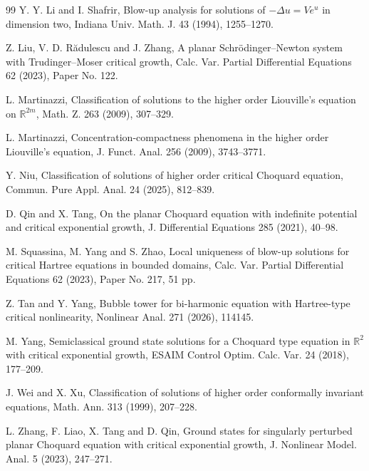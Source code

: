 \documentclass[11pt]{article}
\numberwithin{equation}{section}
\begin{document}
\begin{thebibliography}{99}
Y. Y. Li and I. Shafrir,
Blow-up analysis for solutions of $-\Delta u=Ve^{u}$ in dimension two,
Indiana Univ. Math. J. 43 (1994), 1255--1270.

Z. Liu, V. D. R\u{a}dulescu and J. Zhang,
A planar Schr\"odinger--Newton system with Trudinger--Moser critical
growth,
Calc. Var. Partial Differential Equations 62 (2023), Paper No. 122.

L. Martinazzi,
Classification of solutions to the higher order Liouville's equation on $\mathbb R^{2m}$,
Math. Z. 263 (2009), 307--329.

L. Martinazzi,
Concentration-compactness phenomena in the higher order Liouville's equation,
J. Funct. Anal. 256 (2009), 3743--3771.

Y. Niu,
Classification of solutions of higher order critical Choquard equation,
Commun. Pure Appl. Anal. 24 (2025), 812--839.

D. Qin and X. Tang,
On the planar Choquard equation with indefinite potential and critical
exponential growth,
J. Differential Equations 285 (2021), 40--98.

M. Squassina, M. Yang and S. Zhao,
Local uniqueness of blow-up solutions for critical Hartree equations in bounded domains,
Calc. Var. Partial Differential Equations 62 (2023), Paper No. 217, 51 pp.

Z. Tan and Y. Yang,
Bubble tower for bi-harmonic equation with Hartree-type critical nonlinearity,
Nonlinear Anal. 271 (2026), 114145.

M. Yang,
Semiclassical ground state solutions for a Choquard type equation in
$\mathbb R^2$ with critical exponential growth,
ESAIM Control Optim. Calc. Var. 24 (2018), 177--209.

J. Wei and X. Xu,
Classification of solutions of higher order conformally invariant equations,
Math. Ann. 313 (1999), 207--228.

L. Zhang, F. Liao, X. Tang and D. Qin,
Ground states for singularly perturbed planar Choquard equation with
critical exponential growth,
J. Nonlinear Model. Anal. 5 (2023), 247--271.

\end{thebibliography}
\end{document}
